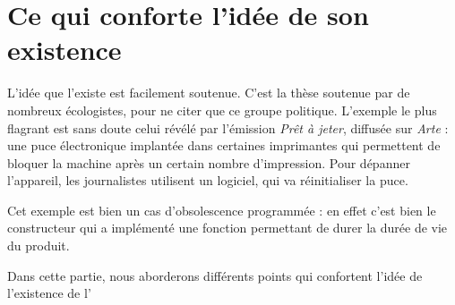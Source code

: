 \section{Ce qui conforte l’idée de son existence}

L'idée que l'\op existe est facilement soutenue. C'est la thèse soutenue par de nombreux écologistes, pour ne citer que ce groupe politique. 
\smallbreak
L'exemple le plus flagrant est sans doute celui révélé par l'émission  \textit{Prêt à jeter}, diffusée sur \textit{Arte} : une puce électronique implantée dans certaines imprimantes qui permettent de bloquer la machine après un certain nombre d'impression. Pour dépanner l'appareil, les journalistes utilisent un logiciel, qui va réinitialiser la puce. 

Cet exemple est bien un cas d'obsolescence programmée : en effet c'est bien le constructeur qui a implémenté une fonction permettant de durer la durée de vie du produit. 

\smallbreak

Dans cette partie, nous aborderons différents points qui confortent l'idée de l’existence de l'\op 